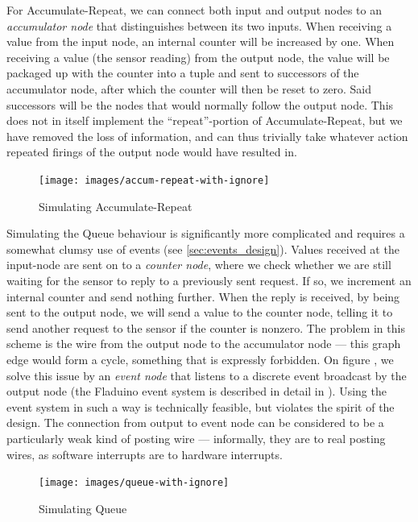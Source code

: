 \documentclass[a4paper, oneside, final]{memoir}
\let\fref\undefined
\begin{document}
For Accumulate-Repeat, we can connect both input and output nodes to
an \textit{accumulator node} that distinguishes between its two
inputs.  When receiving a value from the input node, an internal
counter will be increased by one.  When receiving a value (the sensor
reading) from the output node, the value will be packaged up with the
counter into a tuple and sent to successors of the accumulator node,
after which the counter will then be reset to zero.  Said successors
will be the nodes that would normally follow the output node.  This
does not in itself implement the ``repeat''-portion of
Accumulate-Repeat, but we have removed the loss of information, and
can thus trivially take whatever action repeated firings of the output
node would have resulted in.

\begin{figure}
  \texttt{[image: images/accum-repeat-with-ignore]}
  \caption{Simulating Accumulate-Repeat}
  \centering
  \label{accum-repeat-with-ignore}
\end{figure}

Simulating the Queue behaviour is significantly more complicated and
requires a somewhat clumsy use of events (see
\ref{sec:events_design}).  Values received at the input-node are sent
on to a \textit{counter node}, where we check whether we are still
waiting for the sensor to reply to a previously sent request.  If so,
we increment an internal counter and send nothing further.  When the
reply is received, by being sent to the output node, we will send a
value to the counter node, telling it to send another request to the
sensor if the counter is nonzero.  The problem in this scheme is the
wire from the output node to the accumulator node --- this graph edge
would form a cycle, something that is expressly forbidden.  On figure
\fref{fig:queue-with-ignore}, we solve this issue by an \textit{event node}
that listens to a discrete event broadcast by the output node (the
Fladuino event system is described in detail in
\fref{sec:events_design}).  Using the event system in such a way is
technically feasible, but violates the spirit of the design.  The
connection from output to event node can be considered to be a
particularly weak kind of posting wire --- informally, they are to
real posting wires, as software interrupts are to hardware interrupts.

\begin{figure}
  \texttt{[image: images/queue-with-ignore]}
  \caption{Simulating Queue}
  \centering
  \label{fig:queue-with-ignore}
\end{figure}
\end{document}

